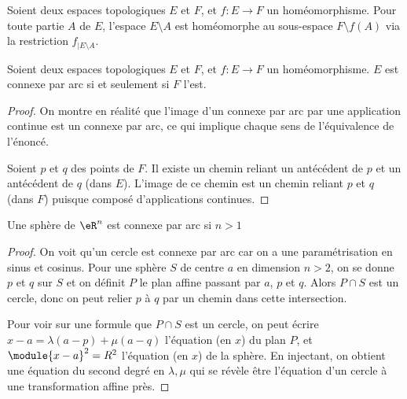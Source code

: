  \begin{rem}Soient deux espaces topologiques $E$ et $F$, et $f :
   E\to F$ un homéomorphisme. Pour toute partie $A$ de $E$,
   l'espace $E\setminus A$ est homéomorphe au sous-espace $F\setminus
   f(A)$ via la restriction $f_{\vert E\setminus A}$.\end{rem}

 \begin{lemma}Soient deux espaces topologiques $E$ et $F$, et $f :
   E\to F$ un homéomorphisme. $E$ est connexe par arc si et
   seulement si $F$ l'est.\end{lemma}
 \begin{proof}On montre en réalité que l'image d'un connexe par arc
   par une application continue est un connexe par arc, ce qui
   implique chaque sens de l'équivalence de l'énoncé.

   Soient $p$ et $q$ des points de $F$. Il existe un chemin reliant
   un antécédent de $p$ et un antécédent de $q$ (dans $E$). L'image
   de ce chemin est un chemin reliant $p$ et $q$ (dans $F$) puisque
   composé d'applications continues.
 \end{proof}

 \begin{lemma}Une sphère de $\eR^n$ est connexe par arc si $n >
   1$\end{lemma}
 \begin{proof}On voit qu'un cercle est connexe par arc car on a une
   paramétrisation en sinus et cosinus. Pour une sphère $S$ de centre
   $a$ en dimension $n > 2$, on se donne $p$ et $q$ sur $S$ et on
   définit $P$ le plan affine passant par $a$, $p$ et $q$. Alors $P
   \cap S$ est un cercle, donc on peut relier $p$ à $q$ par un chemin
   dans cette intersection.

   Pour voir sur une formule que $P \cap S$ est un cercle, on peut
   écrire $x - a = \lambda(a-p) + \mu(a-q)$ l'équation (en $x$) du
   plan $P$, et $\module{x-a}^2 = R^2$ l'équation (en $x$) de la
   sphère. En injectant, on obtient une équation du second degré en
   $\lambda,\mu$ qui se révèle être l'équation d'un cercle à une
   transformation affine près.
 \end{proof}

